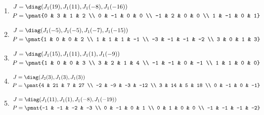\begin{enumerate}
\item

\begin{align*}
J &= \diag(J_{1}(19), J_{1}(11), J_{1}(-8), J_{1}(-16))\\
P &= \pmat{0 & 3 & 1 & 2 \\ 0 & -1 & 0 & 0 \\ -1 & 2 & 0 & 0 \\ 1 & -1 & 0 & 1}
\end{align*}

\item

\begin{align*}
J &= \diag(J_{1}(-5), J_{1}(-5), J_{1}(-7), J_{1}(-15))\\
P &= \pmat{1 & 0 & 0 & 2 \\ 1 & 1 & 1 & -1 \\ -3 & -1 & -1 & -2 \\ 3 & 0 & 1 & 3}
\end{align*}

\item

\begin{align*}
J &= \diag(J_{1}(15), J_{1}(11), J_{1}(1), J_{1}(-9))\\
P &= \pmat{1 & 0 & 0 & 3 \\ 3 & 2 & 1 & 4 \\ -1 & -1 & 0 & -1 \\ 1 & 1 & 0 & 0}
\end{align*}

\item

\begin{align*}
J &= \diag(J_{2}(3), J_{1}(3), J_{1}(3))\\
P &= \pmat{4 & 21 & 7 & 27 \\ -2 & -9 & -3 & -12 \\ 3 & 14 & 5 & 18 \\ 0 & -1 & 0 & -1}
\end{align*}

\item

\begin{align*}
J &= \diag(J_{1}(11), J_{1}(1), J_{1}(-8), J_{1}(-19))\\
P &= \pmat{-1 & -1 & -2 & -3 \\ 0 & -1 & 0 & 1 \\ 0 & 1 & 0 & 0 \\ -1 & -1 & -1 & -2}
\end{align*}


\end{enumerate}
